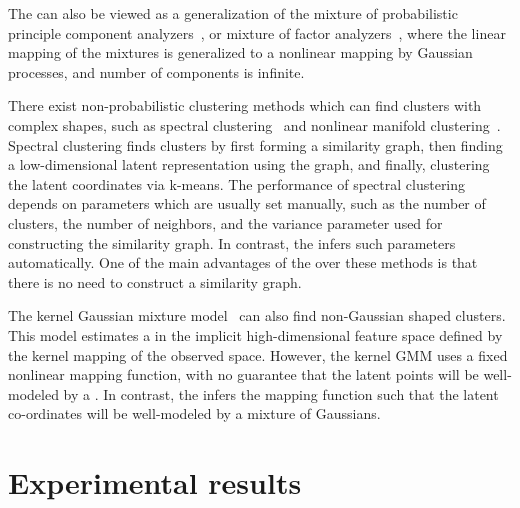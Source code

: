 The \iwmm{} can also be viewed as a generalization of the mixture of probabilistic principle component analyzers~\citep{tipping1999mixtures}, or mixture of factor analyzers~\citep{ghahramani2000variational}, where the linear mapping of the mixtures is generalized to a nonlinear mapping by Gaussian processes, and number of components is infinite.%

There exist non-probabilistic clustering methods which can find clusters with complex shapes, such as spectral clustering~\citep{ng2002spectral} and nonlinear manifold clustering~\citep{cao2006nonlinear,elhamifar2011sparse}.
Spectral clustering finds clusters by first forming a similarity graph, then finding a low-dimensional latent representation using the graph, and finally, clustering the latent coordinates via k-means.
The performance of spectral clustering depends on parameters which are usually set manually, such as the number of clusters, the number of neighbors, and the variance parameter used for constructing the similarity graph.
In contrast, the \iwmm{} infers such parameters automatically.
One of the main advantages of the \iwmm{} over these methods is that there is no need to construct a similarity graph.

The kernel Gaussian mixture model~\citep{wang2003kernel} can also find non-Gaussian shaped clusters.
This model estimates a \GMM{} in the implicit high-dimensional feature space defined by the kernel mapping of the observed space.
However, the kernel GMM uses a fixed nonlinear mapping function, with no guarantee that the latent points will be well-modeled by a \GMM{}.
In contrast, the \iwmm{} infers the mapping function such that the latent co-ordinates will be well-modeled by a mixture of Gaussians.





\section{Experimental results}


